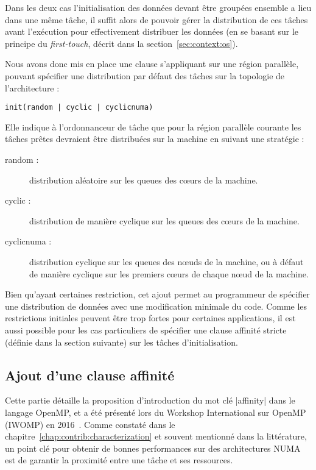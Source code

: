 Dans les deux cas l'initialisation des données devant être groupées ensemble a lieu dans une même tâche, il suffit alors de pouvoir gérer la distribution de ces tâches avant l'exécution pour effectivement distribuer les données (en se basant sur le principe du \emph{first-touch}, décrit dans la section~\ref{sec:context:os}).

Nous avons donc mis en place une clause s'appliquant sur une région parallèle, pouvant spécifier une distribution par défaut des tâches sur la topologie de l'architecture :

\begin{lstlisting}
init(random | cyclic | cyclicnuma)
\end{lstlisting}

Elle indique à l'ordonnanceur de tâche que pour la région parallèle courante les tâches prêtes devraient être distribuées sur la machine en suivant une stratégie :

\begin{description}
  \item [random :]
    distribution aléatoire sur les queues des cœurs de la machine.
  \item [cyclic :]
    distribution de manière cyclique sur les queues des cœurs de la machine.
  \item [cyclicnuma :]
    distribution cyclique sur les queues des nœuds de la machine, ou à défaut de manière cyclique sur les premiers cœurs de chaque nœud de la machine.
\end{description}


Bien qu'ayant certaines restriction, cet ajout permet au programmeur de spécifier une distribution de données avec une modification minimale du code.
Comme les restrictions initiales peuvent être trop fortes pour certaines applications, il est aussi possible pour les cas particuliers de spécifier une clause affinité stricte (définie dans la section suivante) sur les tâches d'initialisation.

\subsection{Ajout d'une clause affinité}\label{sec:openmp:langage:affinity}

Cette partie détaille la proposition d'introduction du mot clé |affinity| dans le langage OpenMP, et a été présenté lors du Workshop International sur OpenMP (IWOMP) en 2016~\cite{Virouleau2016b}.
Comme constaté dans le chapitre~\ref{chap:contrib:characterization} et souvent mentionné dans la littérature, un point clé pour obtenir de bonnes performances sur des architectures NUMA est de garantir la proximité entre une tâche et ses ressources.

